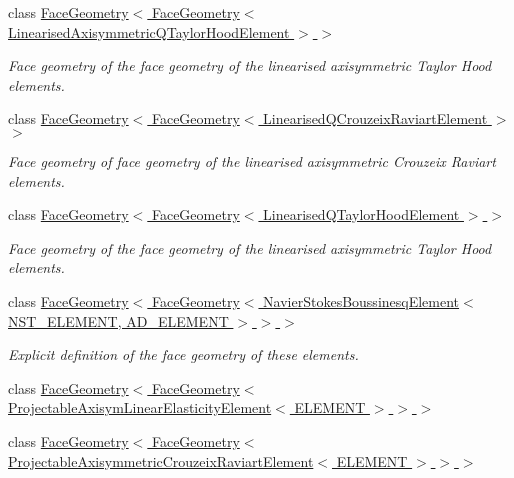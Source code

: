 \begin{DoxyCompactItemize}
class \hyperlink{classoomph_1_1FaceGeometry_3_01FaceGeometry_3_01LinearisedAxisymmetricQTaylorHoodElement_01_4_01_4}{Face\+Geometry$<$ Face\+Geometry$<$ Linearised\+Axisymmetric\+Q\+Taylor\+Hood\+Element $>$ $>$}
\begin{DoxyCompactList}\small\item\em Face geometry of the face geometry of the linearised axisymmetric Taylor Hood elements. \end{DoxyCompactList}\item 
class \hyperlink{classoomph_1_1FaceGeometry_3_01FaceGeometry_3_01LinearisedQCrouzeixRaviartElement_01_4_01_4}{Face\+Geometry$<$ Face\+Geometry$<$ Linearised\+Q\+Crouzeix\+Raviart\+Element $>$ $>$}
\begin{DoxyCompactList}\small\item\em Face geometry of face geometry of the linearised axisymmetric Crouzeix Raviart elements. \end{DoxyCompactList}\item 
class \hyperlink{classoomph_1_1FaceGeometry_3_01FaceGeometry_3_01LinearisedQTaylorHoodElement_01_4_01_4}{Face\+Geometry$<$ Face\+Geometry$<$ Linearised\+Q\+Taylor\+Hood\+Element $>$ $>$}
\begin{DoxyCompactList}\small\item\em Face geometry of the face geometry of the linearised axisymmetric Taylor Hood elements. \end{DoxyCompactList}\item 
class \hyperlink{classoomph_1_1FaceGeometry_3_01FaceGeometry_3_01NavierStokesBoussinesqElement_3_01NST__ELEMENT_00_01AD__ELEMENT_01_4_01_4_01_4}{Face\+Geometry$<$ Face\+Geometry$<$ Navier\+Stokes\+Boussinesq\+Element$<$ N\+S\+T\+\_\+\+E\+L\+E\+M\+E\+N\+T, A\+D\+\_\+\+E\+L\+E\+M\+E\+N\+T $>$ $>$ $>$}
\begin{DoxyCompactList}\small\item\em Explicit definition of the face geometry of these elements. \end{DoxyCompactList}\item 
class \hyperlink{classoomph_1_1FaceGeometry_3_01FaceGeometry_3_01ProjectableAxisymLinearElasticityElement_3_01ELEMENT_01_4_01_4_01_4}{Face\+Geometry$<$ Face\+Geometry$<$ Projectable\+Axisym\+Linear\+Elasticity\+Element$<$ E\+L\+E\+M\+E\+N\+T $>$ $>$ $>$}
\item 
class \hyperlink{classoomph_1_1FaceGeometry_3_01FaceGeometry_3_01ProjectableAxisymmetricCrouzeixRaviartElement_3_01ELEMENT_01_4_01_4_01_4}{Face\+Geometry$<$ Face\+Geometry$<$ Projectable\+Axisymmetric\+Crouzeix\+Raviart\+Element$<$ E\+L\+E\+M\+E\+N\+T $>$ $>$ $>$}

\end{DoxyCompactItemize}
